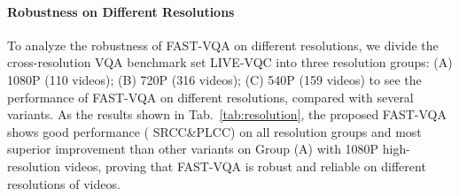 \documentclass[runningheads]{llncs}
\begin{document}
\paragraph{Robustness on Different Resolutions}
    To analyze the robustness of FAST-VQA on different resolutions, we divide the cross-resolution VQA benchmark set LIVE-VQC into three resolution groups: (A) 1080P (110 videos); (B) 720P (316 videos); (C) 540P (159 videos) to see the performance of FAST-VQA on different resolutions, compared with several variants. As the results shown in Tab.~\ref{tab:resolution}, the proposed FAST-VQA shows good performance ( SRCC\&PLCC) on all resolution groups and most superior improvement than other variants on Group (A) with 1080P high-resolution videos, proving that FAST-VQA is robust and reliable on different resolutions of videos.

\begin{table}
\center
\setlength\tabcolsep{5pt}
\renewcommand\arraystretch{1.15}
\footnotesize
\vspace{-16pt}
\caption{Performance comparison on different resolution groups of LIVE-VQC dataset.} 
\label{tab:resolution}
\vspace{-25pt}
\end{table}
\end{document}
